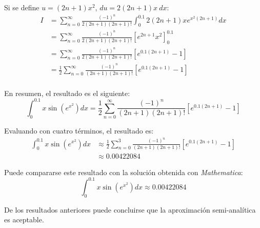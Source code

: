 \begin{ex}
\begin{solution}
        Si se define $u = (2n + 1) x^2$, $du = 2(2n + 1)x\ dx$:
        \begin{align*}
            I &= \sum_{n = 0}^{\infty} \frac{(-1)^n}{2(2n + 1)(2n + 1)!}
            \int_{0}^{0.1} 2(2n + 1) x e^{x^2(2n + 1)} dx \\
              &= \sum_{n = 0}^{\infty} \frac{(-1)^n}{2(2n + 1)(2n + 1)!}
              \left[e^{2n + 1}x^2 \right]_{0}^{0.1}\\
              &= \sum_{n = 0}^{\infty} \frac{(-1)^n}{2(2n + 1)(2n + 1)!}
              \left[e^{0.1(2n + 1)} - 1 \right]\\
              &= \frac{1}{2} \sum_{n = 0}^{\infty} \frac{(-1)^n}{(2n + 1)(2n
              + 1)!} \left[e^{0.1(2n + 1)} - 1 \right]\\
        \end{align*}

        En resumen, el resultado es el siguiente:
        \[
            \int_{0}^{0.1} x \sin(e^{x^2}) dx = \frac{1}{2} \sum_{n = 0}^{\infty} \frac{(-1)^n}{(2n + 1)(2n + 1)!} \left[e^{0.1(2n + 1)} - 1 \right]
        \]


        Evaluando con cuatro términos, el resultado es:
        \begin{align*}
            \int_{0}^{0.1} x \sin(e^{x^2}) dx &\approx \frac{1}{2} \sum_{n = 0}^{3} \frac{(-1)^n}{(2n + 1)(2n + 1)!} \left[e^{0.1(2n + 1)} - 1 \right]\\
                                              &\approx 0.00422084
        \end{align*}

        Puede compararse este resultado con la solución obtenida con
        \textit{Mathematica}:
        \[
            \boxed{\int_{0}^{0.1} x \sin(e^{x^2}) dx \approx 0.00422084}
        \]

        De los resultados anteriores puede concluirse que la aproximación
        semi-analítica es aceptable.
    \end{solution}

\end{ex}


